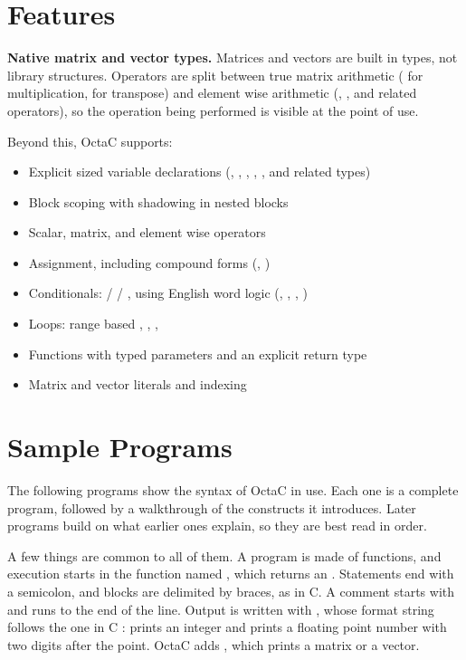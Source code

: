 \section{Features}

\noindent\textbf{Native matrix and vector types.} Matrices and vectors are
built in types, not library structures. Operators are split between true
matrix arithmetic (\code{*} for multiplication,  for transpose) and
element wise arithmetic (, , and related operators), so
the operation being performed is visible at the point of use.

Beyond this, OctaC supports:

\begin{itemize}
    \item Explicit sized variable declarations (, ,
    , , , and related types)
    \item Block scoping with shadowing in nested blocks
    \item Scalar, matrix, and element wise operators
    \item Assignment, including compound forms (\code{+=}, \code{*=})
    \item Conditionals:  /  / , using
    English word logic (, , , )
    \item Loops: range based , , ,
    \item Functions with typed parameters and an explicit return type
    \item Matrix and vector literals and indexing
\end{itemize}

\section{Sample Programs}

The following programs show the syntax of OctaC in use. Each one is a
complete program, followed by a walkthrough of the constructs it introduces.
Later programs build on what earlier ones explain, so they are best read in
order.

A few things are common to all of them. A program is made of functions, and
execution starts in the function named , which returns an
. Statements end with a semicolon, and blocks are delimited by
braces, as in C. A comment starts with \code{//} and runs to the end of the
line. Output is written with , whose format string follows the
one in C \cite{kernighan1988c}:  prints an integer and 
prints a floating point number with two digits after the point. OctaC adds
, which prints a matrix or a vector.

